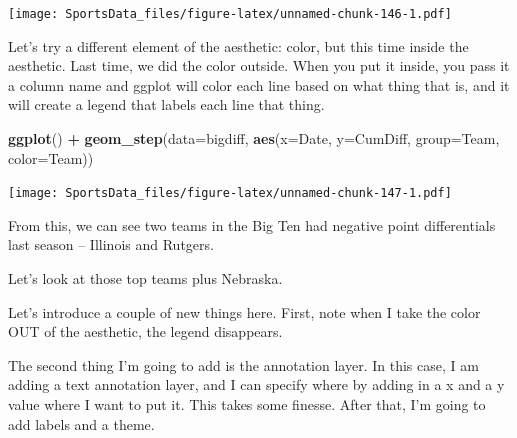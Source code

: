 \documentclass[]{book}
\newenvironment{Shaded}{\begin{snugshade}}{\end{snugshade}}
\newcommand{\DataTypeTok}[1]{\textcolor[rgb]{0.13,0.29,0.53}{#1}}
\newcommand{\KeywordTok}[1]{\textcolor[rgb]{0.13,0.29,0.53}{\textbf{#1}}}
\newcommand{\NormalTok}[1]{#1}
\newcommand{\OperatorTok}[1]{\textcolor[rgb]{0.81,0.36,0.00}{\textbf{#1}}}
\newcommand{\StringTok}[1]{\textcolor[rgb]{0.31,0.60,0.02}{#1}}
\begin{document}
\texttt{[image: SportsData\_files/figure-latex/unnamed-chunk-146-1.pdf]}

Let's try a different element of the aesthetic: color, but this time inside the aesthetic. Last time, we did the color outside. When you put it inside, you pass it a column name and ggplot will color each line based on what thing that is, and it will create a legend that labels each line that thing.

\begin{Shaded}
\begin{Highlighting}[]
\KeywordTok{ggplot}\NormalTok{() }\OperatorTok{+}\StringTok{ }\KeywordTok{geom_step}\NormalTok{(}\DataTypeTok{data=}\NormalTok{bigdiff, }\KeywordTok{aes}\NormalTok{(}\DataTypeTok{x=}\NormalTok{Date, }\DataTypeTok{y=}\NormalTok{CumDiff, }\DataTypeTok{group=}\NormalTok{Team, }\DataTypeTok{color=}\NormalTok{Team))}
\end{Highlighting}
\end{Shaded}

\texttt{[image: SportsData\_files/figure-latex/unnamed-chunk-147-1.pdf]}

From this, we can see two teams in the Big Ten had negative point differentials last season -- Illinois and Rutgers.

Let's look at those top teams plus Nebraska.

\begin{Shaded}
\end{Shaded}

Let's introduce a couple of new things here. First, note when I take the color OUT of the aesthetic, the legend disappears.

The second thing I'm going to add is the annotation layer. In this case, I am adding a text annotation layer, and I can specify where by adding in a x and a y value where I want to put it. This takes some finesse. After that, I'm going to add labels and a theme.
\end{document}
